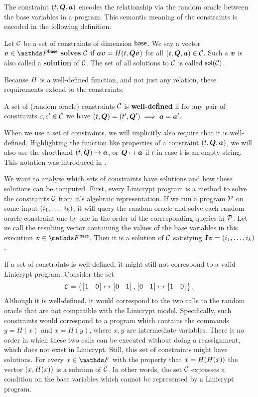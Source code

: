 The constraint $(t, \Q, \va)$ encodes the relationship via the random oracle between the base variables in a program.
This semantic meaning of the constraints is encoded in the following definition.
\begin{defn}
    Let $\C$ be a set of constraints of dimension $\base$.
    We say a vector $\vv \in \Base$ \textbf{solves} $\C$ if
    $\va \vv = \H(t, \Q \vv)$ for all $(t, \Q, \va) \in \C$.
    Such a $\vv$ is also called a \textbf{solution} of $\C$.
    The set of all solutions to $\C$ is called $\sol(\C)$.
\end{defn}

Because $\H$ is a well-defined function,
and not just any relation,
these requirements extend to the constraints.

\begin{defn}
A set of (random oracle) constraints $\C$ is \textbf{well-defined} if for any pair of constraints 
$c, c' \in \C$ we have $(t,\Q) = (t', \Q') \implies \va = \va'$.
\end{defn}

When we use a set of constraints, we will implicitly also require that it is well-defined.
Highlighting the function like properties of a constraint $(t, \Q, \va)$,
we will also use the shorthand $(t,\Q) \mapsto \va$, or $\Q \mapsto \va$ if $t$ in case t is an empty string.
This notation was introduced in \cite{CSF:HolRosRoy22}.

We want to analyze which sets of constraints have solutions and how these solutions can be computed.
First, every Linicrypt program is a method to solve the constraints $\C$ from it's algebraic representation.
If we run a program $\P$ on some input $(\dts i k)$,
it will query the random oracle
and solve each random oracle constraint one by one in the order of the corresponding queries in $\P$.
Let us call the resulting vector containing the values of the base variables in this execution $\vv \in \Fsp$.
Then it is a solution of $\C$ satisfying $\I\vv = (\dts i k)$.

If a set of constraints is well-defined, it might still not  correspond to a valid Linicrypt program.
Consider the set
\[
\C = \left\{ \m{1&0} \mapsto \m{0&1}, \m{0&1} \mapsto \m{1&0}\right\}.
\]
Although it is well-defined,
it would correspond to the two calls to the random oracle that are not compatible with the Linicrypt model.
Specifically, such constraints would correspond to a program which contains the commands
$y = H(x)$ and $x = H(y)$, where $x,y$ are intermediate variables.
There is no order in which these two calls can be executed without doing a reassignment,
which does not exist in Linicrypt.
Still, this set of constraints might have solutions.
For every $x \in \F$ with the property that $x = \H(\H(x))$ the vector $(x, \H(x))$ is a solution of $\C$.
In other words,
the set $\C$ expresses a condition on the base variables which cannot be represented by a Linicrypt program.

